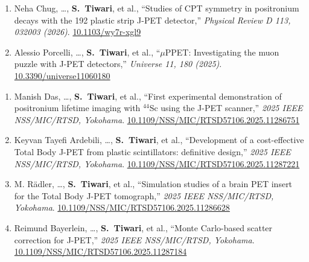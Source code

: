 \documentclass[10.5pt,a4paper]{article}
\newcommand{\me}{\textbf{S.~Tiwari}}
\newcommand{\doi}[2]{{\small\href{#1}{#2}}}
\newcommand{\sub}[1]{\vspace{3pt}{\sffamily\small\bfseries\color{mute}\MakeUppercase{#1}}\par\vspace{2pt}}
\begin{document}
\begin{enumerate}[resume]
\item Neha Chug, \ldots, \me, et al., ``Studies of CPT symmetry in positronium decays with the 192 plastic strip J-PET detector,'' \emph{Physical Review D 113, 032003 (2026)}. \doi{https://doi.org/10.1103/wy7r-xgl9}{10.1103/wy7r-xgl9}
\item Alessio Porcelli, \ldots, \me, et al., ``$\mu$PPET: Investigating the muon puzzle with J-PET detectors,'' \emph{Universe 11, 180 (2025)}. \doi{https://doi.org/10.3390/universe11060180}{10.3390/universe11060180}
\end{enumerate}
\sub{Conference proceedings}
\begin{enumerate}[resume]
\item Manish Das, \ldots, \me, et al., ``First experimental demonstration of positronium lifetime imaging with $^{44}$Sc using the J-PET scanner,'' \emph{2025 IEEE NSS/MIC/RTSD, Yokohama}. \doi{https://doi.org/10.1109/NSS/MIC/RTSD57106.2025.11286751}{10.1109/NSS/MIC/RTSD57106.2025.11286751}
\item Keyvan Tayefi Ardebili, \ldots, \me, et al., ``Development of a cost-effective Total Body J-PET from plastic scintillators: definitive design,'' \emph{2025 IEEE NSS/MIC/RTSD, Yokohama}. \doi{https://doi.org/10.1109/NSS/MIC/RTSD57106.2025.11287221}{10.1109/NSS/MIC/RTSD57106.2025.11287221}
\item M. R{\"a}dler, \ldots, \me, et al., ``Simulation studies of a brain PET insert for the Total Body J-PET tomograph,'' \emph{2025 IEEE NSS/MIC/RTSD, Yokohama}. \doi{https://doi.org/10.1109/NSS/MIC/RTSD57106.2025.11286628}{10.1109/NSS/MIC/RTSD57106.2025.11286628}
\item Reimund Bayerlein, \ldots, \me, et al., ``Monte Carlo-based scatter correction for J-PET,'' \emph{2025 IEEE NSS/MIC/RTSD, Yokohama}. \doi{https://doi.org/10.1109/NSS/MIC/RTSD57106.2025.11287184}{10.1109/NSS/MIC/RTSD57106.2025.11287184}
\end{enumerate}
\end{document}
